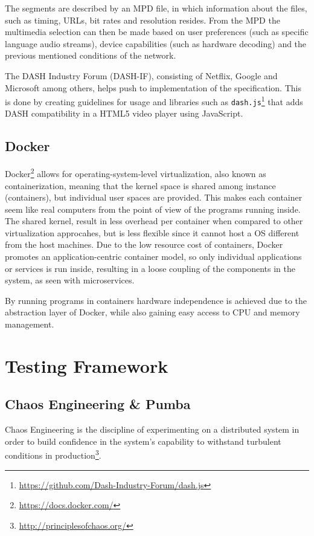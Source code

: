 The segments are described by an \ac{MPD} file, in which information about the files, such as timing, \ac{URL}s, bit rates and resolution resides. From the \ac{MPD} the multimedia selection can then be made based on user preferences (such as specific language audio streams), device capabilities (such as hardware decoding) and the previous mentioned conditions of the network.

The \ac{DASH} Industry Forum (DASH-IF), consisting of Netflix, Google and Microsoft among others, helps push to implementation of the specification\cite{ISO23009}. This is done by creating guidelines for usage and libraries such as \texttt{dash.js}\footnote{\url{https://github.com/Dash-Industry-Forum/dash.js}} that adds \ac{DASH} compatibility in a \ac{HTML}5 video player using JavaScript.

\subsection{Docker}
Docker\footnote{\url{https://docs.docker.com/}} allows for operating-system-level virtualization, also known as containerization, meaning that the kernel space is shared among instance (containers), but individual user spaces are provided. This makes each container seem like real computers from the point of view of the programs running inside. 
The shared kernel, result in less overhead per container when compared to other virtualization approcahes, but is less flexible since it cannot host a \ac{OS} different from the host machines. Due to the low resource cost of containers, Docker promotes an application-centric container model\cite{merkel2014docker}, so only individual applications or services is run inside, resulting in a loose coupling of the components in the system, as seen with microservices. 

By running programs in containers hardware independence is achieved due to the abstraction layer of Docker, while also gaining easy access to CPU and memory management.

\section{Testing Framework}
\subsection{Chaos Engineering \& Pumba}
\label{sec:framework_pumba}
Chaos Engineering is the discipline of experimenting on a distributed system in order to build confidence in the system’s capability to withstand turbulent conditions in production\footnote{\url{http://principlesofchaos.org/}}.

